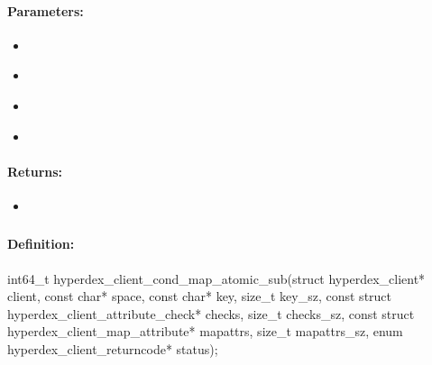 \paragraph{Parameters:}
\begin{itemize}[noitemsep]
\item {}\\

\item {}\\

\item {}\\

\item {}\\

\end{itemize}

\paragraph{Returns:}
\begin{itemize}[noitemsep]
\item {}\\

\end{itemize}

\pagebreak
\subsubsection{}
\label{api:c:cond_map_atomic_sub}


\paragraph{Definition:}
\begin{ccode}
int64_t hyperdex_client_cond_map_atomic_sub(struct hyperdex_client* client,
        const char* space,
        const char* key, size_t key_sz,
        const struct hyperdex_client_attribute_check* checks, size_t checks_sz,
        const struct hyperdex_client_map_attribute* mapattrs, size_t mapattrs_sz,
        enum hyperdex_client_returncode* status);
\end{ccode}

